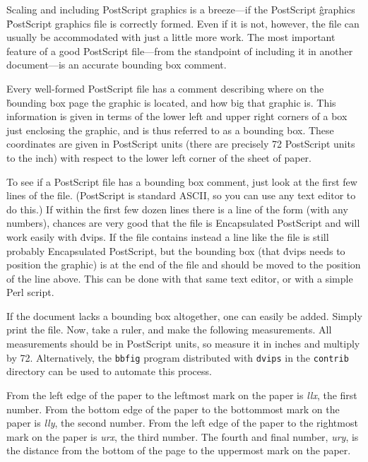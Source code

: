 
Scaling and including PostScript graphics is a breeze---if the PostScript
\^{graphics}
\^{PostScript graphics}
file is correctly formed.  Even if it is not, however, the file can usually
be accommodated with just a little more work.  The most important feature of
a good PostScript file---from the standpoint of including it in another
document---is an accurate bounding box comment.


Every well-formed PostScript file has a comment describing where on the
\^{bounding box}
page the graphic is located, and how big that graphic is.  This information
is given in terms of the lower left and upper right corners of a box just
enclosing the graphic, and is thus referred to as a bounding box.
These coordinates are given
in PostScript units (there are precisely 72 PostScript units to
the inch) with respect to the lower left corner of the sheet of paper.

To see if a PostScript file has a bounding box comment, just
look at the first few lines of the file.
(PostScript is standard ASCII, so you can use any text editor to do this.)
If within the first few dozen lines there is a line of the form
\noindent
(with any numbers), chances are very good that the file is Encapsulated
PostScript and will work easily with \.{dvips}.  If the file contains
instead a line like
\noindent
the file is still probably Encapsulated PostScript, but the bounding
box (that \.{dvips} needs to position the graphic) is at the end of the
file and should be moved to the position of the line above.  This can be
done with that same text editor, or with a simple Perl script.

If the document lacks a bounding box altogether, one can easily be added.
Simply print the file.	Now, take a ruler, and make the following measurements.
All measurements should be in PostScript units, so measure it in inches and
multiply by 72.  Alternatively, the {\tt bbfig} program distributed with
{\tt dvips} in the {\tt contrib} directory can be used to automate
this process.

From the left edge of the paper to the leftmost mark on the paper is
{\it llx}, the first number.  From the bottom edge of the paper to the
bottommost mark on the paper is {\it lly}, the second number.  From
the left edge of the paper to the rightmost mark on the paper is
{\it urx}, the third number.  The fourth and final number, {\it ury}, is
the distance from the bottom of the page to the uppermost mark on the
paper.

